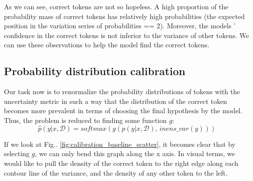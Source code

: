 \documentclass[a4paper,14pt]{extarticle}
\begin{document}
	As we can see, correct tokens are not so hopeless. A high proportion of the probability mass of correct tokens has relatively high probabilities (the expected position in the variation series of probabilities == 2). Moreover, the models ' confidence in the correct tokens is not inferior to the variance of other tokens. We can use these observations to help the model find the correct tokens.
	
\subsection{Probability distribution calibration}
	Our task now is to renormalize the probability distributions of tokens with the uncertainty metric in such a way that the distribution of the correct token becomes more prevalent in terms of choosing the final hypothesis by the model. Thus, the problem is reduced to finding some function $g$:
	\begin{equation*}
		\hat{p}(y | x, \mathcal{D}) = softmax(g(p(y | x, \mathcal{D}),\, inens\_var(y)))
	\end{equation*}
	
	\begin{figure}[H]
	\end{figure} 
	
	If we look at Fig.. \ref{fig:calibration_baseline_scatter}, it becomes clear that by selecting $g$, we can only bend this graph along the x axis. In visual terms, we would like to pull the density of the correct token to the right edge along each contour line of the variance, and the density of any other token to the left.
	
\end{document}
